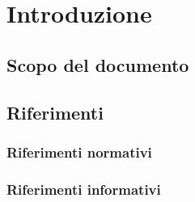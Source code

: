 
\section{Introduzione}

\subsection{Scopo del documento}
\subsection{Riferimenti}
\subsubsection{Riferimenti normativi}
\subsubsection{Riferimenti informativi} 
